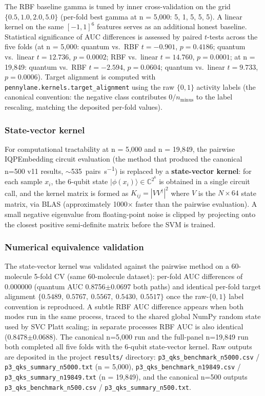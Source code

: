 \documentclass[11pt,a4paper]{article}
\begin{document}
The RBF baseline gamma is tuned by inner cross-validation on the grid $\{0.5, 1.0, 2.0, 5.0\}$ (per-fold best gamma at n = 5,000: 5, 1, 5, 5, 5). A linear kernel on the same $[-1,1]^6$ features serves as an additional honest baseline. Statistical significance of AUC differences is assessed by paired $t$-tests across the five folds (at n = 5,000: quantum vs.\ RBF $t=-0.901$, $p=0.4186$; quantum vs.\ linear $t=12.736$, $p=0.0002$; RBF vs.\ linear $t=14.760$, $p=0.0001$; at n = 19,849: quantum vs.\ RBF $t=-2.594$, $p=0.0604$; quantum vs.\ linear $t=9.733$, $p=0.0006$). Target alignment is computed with \texttt{pennylane.kernels.target\_alignment} using the raw $\{0,1\}$ activity labels (the canonical convention: the negative class contributes $0/n_{\text{minus}}$ to the label rescaling, matching the deposited per-fold values).

\subsubsection{State-vector kernel}
For computational tractability at n = 5,000 and n = 19,849, the pairwise IQPEmbedding circuit evaluation (the method that produced the canonical n=500 v11 results, $\sim$\SI{535}{pairs\per\second}) is replaced by a \textbf{state-vector kernel}: for each sample $x_i$, the 6-qubit state $|\phi(x_i)\rangle \in \mathbb{C}^{2^6}$ is obtained in a single circuit call, and the kernel matrix is formed as $K_{ij} = |V V^\dagger|^2$ where $V$ is the $N \times 64$ state matrix, via BLAS (approximately \num{1000}$\times$ faster than the pairwise evaluation). A small negative eigenvalue from floating-point noise is clipped by projecting onto the closest positive semi-definite matrix before the SVM is trained.

\subsubsection{Numerical equivalence validation}
The state-vector kernel was validated against the pairwise method on a 60-molecule 5-fold CV (same 60-molecule dataset): per-fold AUC differences of $0.000000$ (quantum AUC \num{0.8756}$\pm$0.0697 both paths) and identical per-fold target alignment $\{0.5489,\ 0.5767,\ 0.5567,\ 0.5430,\ 0.5517\}$ once the raw-$\{0,1\}$ label convention is reproduced. A subtle RBF AUC difference appears when both modes run in the same process, traced to the shared global NumPy random state used by SVC Platt scaling; in separate processes RBF AUC is also identical (0.8478$\pm$0.0688). The canonical n=5,000 run  and the full-panel n=19,849 run  both completed all five folds with the 6-qubit state-vector kernel. Raw outputs are deposited in the project \texttt{results/} directory: \texttt{p3\_qks\_benchmark\_n5000.csv} / \texttt{p3\_qks\_summary\_n5000.txt} (n = 5,000), \texttt{p3\_qks\_benchmark\_n19849.csv} / \texttt{p3\_qks\_summary\_n19849.txt} (n = 19,849), and the canonical n=500 outputs \texttt{p3\_qks\_benchmark\_n500.csv} / \texttt{p3\_qks\_summary\_n500.txt}.
\end{document}
